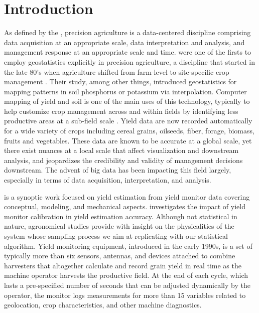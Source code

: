 \chapter{Introduction}

As defined by the \citet{Council1997}, precision agriculture is a
data-centered discipline comprising data acquisition at an appropriate
scale, data interpretation and analysis, and management response at an
appropriate scale and time. \cite{Miller1988} were one of the firsts
to employ geostatistics explicitly in precision agriculture, a
discipline that started in the late 80's when agriculture shifted from
farm-level to site-specific crop management \citep{Oliver2010}. Their
study, among other things, introduced geostatistics for mapping
patterns in soil phosphorus or potassium via interpolation. Computer
mapping of yield and soil is one of the main uses of this technology,
typically to help customize crop management across and within fields
by identifying less productive areas at a sub-field scale
\citep{Lowenberg-DeBoer2019}. Yield data are now recorded
automatically for a wide variety of crops including cereal grains,
oilseeds, fiber, forage, biomass, fruits and vegetables. These data
are known to be accurate at a global scale, yet there exist nuances at
a local scale that affect visualization and downstream analysis, and
jeopardizes the credibility and validity of management decisions
downstream. The advent of big data has been impacting this field
largely, especially in terms of data acquisition, interpretation, and
analysis.

\cite{Ross2008} is a synoptic work focused on yield estimation from
yield monitor data covering conceptual, modeling, and mechanical
aspects. \cite{Arslan2002} investigates the impact of yield monitor
calibration in yield estimation accuracy. Although not statistical in
nature, agronomical studies provide with insight on the physicalities
of the system whose sampling process we aim at replicating with our
statistical algorithm. Yield monitoring equipment, introduced in the
early 1990s, is a set of typically more than six sensors, antennas,
and devices attached to combine harvesters that altogether calculate
and record grain yield in real time as the machine operator harvests
the productive field. At the end of each cycle, which lasts a
pre-specified number of seconds that can be adjusted dynamically by
the operator, the monitor logs measurements for more than 15 variables
related to geolocation, crop characteristics, and other machine
diagnostics.

